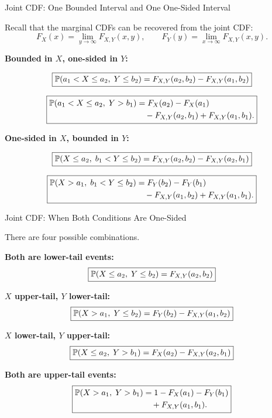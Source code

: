 \begin{frame}{Joint CDF: One Bounded Interval and One One-Sided Interval}

Recall that the marginal CDFs can be recovered from the joint CDF:
$$
F_X(x)
=
\lim_{y\to\infty}F_{X,Y}(x,y),
\qquad
F_Y(y)
=
\lim_{x\to\infty}F_{X,Y}(x,y).
$$

\textbf{Bounded in $X$, one-sided in $Y$:}

$$
\boxed{
\mathbb{P}(a_1<X\le a_2,\;Y\le b_2)
=
F_{X,Y}(a_2,b_2)-F_{X,Y}(a_1,b_2)
}
$$

$$
\boxed{
\begin{aligned}
\mathbb{P}(a_1<X\le a_2,\;Y>b_1)
&=
F_X(a_2)-F_X(a_1)
\\
&\quad
-F_{X,Y}(a_2,b_1)
+F_{X,Y}(a_1,b_1).
\end{aligned}
}
$$

\textbf{One-sided in $X$, bounded in $Y$:}

$$
\boxed{
\mathbb{P}(X\le a_2,\;b_1<Y\le b_2)
=
F_{X,Y}(a_2,b_2)-F_{X,Y}(a_2,b_1)
}
$$

$$
\boxed{
\begin{aligned}
\mathbb{P}(X>a_1,\;b_1<Y\le b_2)
&=
F_Y(b_2)-F_Y(b_1)
\\
&\quad
-F_{X,Y}(a_1,b_2)
+F_{X,Y}(a_1,b_1).
\end{aligned}
}
$$

\end{frame}


\begin{frame}{Joint CDF: When Both Conditions Are One-Sided}

There are four possible combinations.

\vspace{0.15cm}

\textbf{Both are lower-tail events:}
$$
\boxed{
\mathbb{P}(X\le a_2,\;Y\le b_2)
=
F_{X,Y}(a_2,b_2)
}
$$

\textbf{$X$ upper-tail, $Y$ lower-tail:}
$$
\boxed{
\mathbb{P}(X>a_1,\;Y\le b_2)
=
F_Y(b_2)-F_{X,Y}(a_1,b_2)
}
$$

\textbf{$X$ lower-tail, $Y$ upper-tail:}
$$
\boxed{
\mathbb{P}(X\le a_2,\;Y>b_1)
=
F_X(a_2)-F_{X,Y}(a_2,b_1)
}
$$

\textbf{Both are upper-tail events:}
$$
\boxed{
\begin{aligned}
\mathbb{P}(X>a_1,\;Y>b_1)
&=
1-F_X(a_1)-F_Y(b_1)
\\
&\quad
+F_{X,Y}(a_1,b_1).
\end{aligned}
}
$$

\end{frame}

